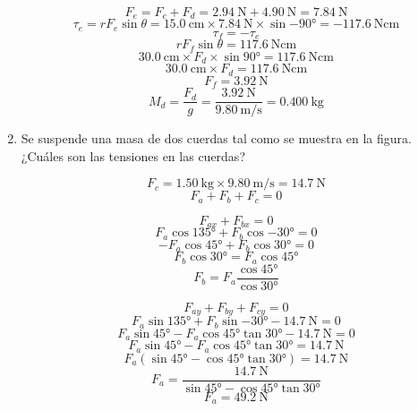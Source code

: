 \documentclass[../practica.root.tex]{subfiles}
\begin{document}
\begin{enumerate}
\begin{multicols}{2}
		      \[
			      F_e=F_c+F_d
			      =\SI{2,94}{\newton}+\SI{4,90}{\newton}
			      =\SI{7,84}{\newton}
		      \]
		      \[
			      \tau_e=rF_e\sin{\theta}
			      =\SI{15,0}{\cm}\times\SI{7,84}{\newton}\times\sin{\ang{-90}}
			      =\SI{-117,6}{\newton\cm}
		      \]
		      \[\tau_f=-\tau_e\]
		      \[rF_f\sin{\theta}=\SI{117,6}{\newton\cm}\]
		      \[\SI{30,0}{\cm}\times F_d\times\sin{\ang{90}}=\SI{117,6}{\newton\cm}\]
		      \[\SI{30,0}{\cm}\times F_d=\SI{117,6}{\newton\cm}\]
		      \[F_f=\SI{3,92}{\newton}\]
		      \[
			      M_d=\frac{F_d}{g}
			      =\frac{\SI{3,92}{\newton}}{\SI{9,80}{\meter\per\second}}
			      =\boxed{\SI{0,400}{\kilogram}}
		      \]
	      \end{multicols}

	      \newpage
	\item Se suspende una masa de dos cuerdas tal como se muestra en la figura. ¿Cuáles son las tensiones en las cuerdas?

	      \begin{center}
	      \end{center}

	      \begin{multicols}{2}
		      \[
			      F_c=\SI{1,50}{\kilogram}\times\SI{9,80}{\meter\per\second}
			      =\SI{14,7}{\newton}
		      \]
		      \[F_a+F_b+F_c=0\]

		      \[F_{ax}+F_{bx}=0\]
		      \[F_a\cos{\ang{135}}+F_b\cos{\ang{-30}}=0\]
		      \[-F_a\cos{\ang{45}}+F_b\cos{\ang{30}}=0\]
		      \[F_b\cos{\ang{30}}=F_a\cos{\ang{45}}\]
		      \[F_b=F_a\frac{\cos{\ang{45}}}{\cos{\ang{30}}}\]

		      \[F_{ay}+F_{by}+F_{cy}=0\]
		      \[F_a\sin{\ang{135}}+F_b\sin{\ang{-30}}-\SI{14,7}{\newton}=0\]
		      \[F_a\sin{\ang{45}}-F_a\cos{\ang{45}}\tan{\ang{30}}-\SI{14,7}{\newton}=0\]
		      \[F_a\sin{\ang{45}}-F_a\cos{\ang{45}}\tan{\ang{30}}=\SI{14,7}{\newton}\]
		      \[F_a(\sin{\ang{45}}-\cos{\ang{45}}\tan{\ang{30}})=\SI{14,7}{\newton}\]
		      \[F_a=\frac{\SI{14,7}{\newton}}{\sin{\ang{45}}-\cos{\ang{45}}\tan{\ang{30}}}\]
		      \[F_a=\boxed{\SI{49.2}{\newton}}\]


\end{multicols}
\end{enumerate}
\end{document}
